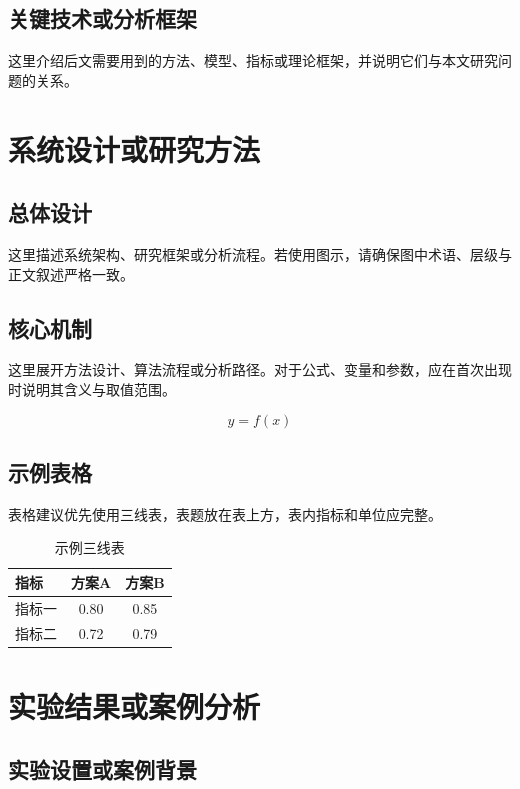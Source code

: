 \section{关键技术或分析框架}

这里介绍后文需要用到的方法、模型、指标或理论框架，并说明它们与本文研究问题的关系。

\chapter{系统设计或研究方法}

\section{总体设计}

这里描述系统架构、研究框架或分析流程。若使用图示，请确保图中术语、层级与正文叙述严格一致。

\section{核心机制}

这里展开方法设计、算法流程或分析路径。对于公式、变量和参数，应在首次出现时说明其含义与取值范围。

\begin{equation}
  y = f(x)
\end{equation}

\section{示例表格}

表格建议优先使用三线表，表题放在表上方，表内指标和单位应完整。

\begin{table}[H]
  \centering
  \wuhao
  \caption{示例三线表}
  \label{tab:sample}
  \begin{tabular}{lcc}
    \toprule
    指标 & 方案A & 方案B \\
    \midrule
    指标一 & 0.80 & 0.85 \\
    指标二 & 0.72 & 0.79 \\
    \bottomrule
  \end{tabular}
\end{table}

\chapter{实验结果或案例分析}

\section{实验设置或案例背景}

